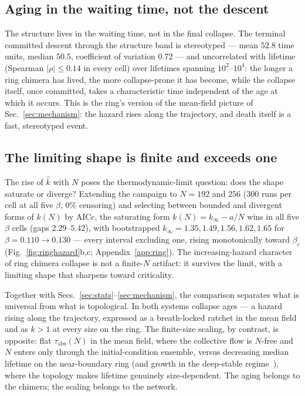 \documentclass[pdflatex,sn-mathphys,Numbered]{sn-jnl}
\begin{document}
\subsection{Aging in the waiting time, not the descent}

The structure lives in the waiting time, not in the final collapse. The terminal
committed descent through the structure band is stereotyped --- mean $52.8$ time
units, median $50.5$, coefficient of variation $0.72$ --- and uncorrelated with
lifetime (Spearman $|\rho| \le 0.14$ in every cell) over lifetimes spanning
$10^2$--$10^4$: the longer a ring chimera has lived, the more collapse-prone it
has become, while the collapse itself, once committed, takes a characteristic
time independent of the age at which it occurs. This is the ring's version of
the mean-field picture of Sec.~\ref{sec:mechanism}: the hazard rises along the
trajectory, and death itself is a fast, stereotyped event.

\subsection{The limiting shape is finite and exceeds one}

The rise of $\hat k$ with $N$ poses the thermodynamic-limit question: does the
shape saturate or diverge? Extending the campaign to $N = 192$ and $256$ ($300$
runs per cell at all five $\beta$, $0\%$ censoring) and selecting between
bounded and divergent forms of $k(N)$ by AICc, the saturating form
$k(N) = k_\infty - a/N$ wins in all five $\beta$ cells (gaps $2.29$--$5.42$),
with bootstrapped $k_\infty = 1.35, 1.49, 1.56, 1.62, 1.65$ for
$\beta = 0.110 \to 0.130$ --- every interval excluding one, rising monotonically
toward $\beta_c$ (Fig.~\ref{fig:ringhazard}b,c; Appendix~\ref{app:ring}). The
increasing-hazard character of ring chimera collapse is not a finite-$N$
artifact: it survives the limit, with a limiting shape that sharpens toward
criticality.

Together with Secs.~\ref{sec:stats}--\ref{sec:mechanism}, the comparison
separates what is universal from what is topological. In both systems collapse
ages --- a hazard rising along the trajectory, expressed as a breath-locked
ratchet in the mean field and as $k > 1$ at every size on the ring. The
finite-size scaling, by contrast, is opposite: flat $\tau_{\mathrm{abs}}(N)$ in
the mean field, where the collective flow is $N$-free and $N$ enters only
through the initial-condition ensemble, versus decreasing median lifetime on the
near-boundary ring (and growth in the deep-stable regime~\cite{wo2011}), where
the topology makes lifetime genuinely size-dependent. The aging belongs to the
chimera; the scaling belongs to the network.
\end{document}
